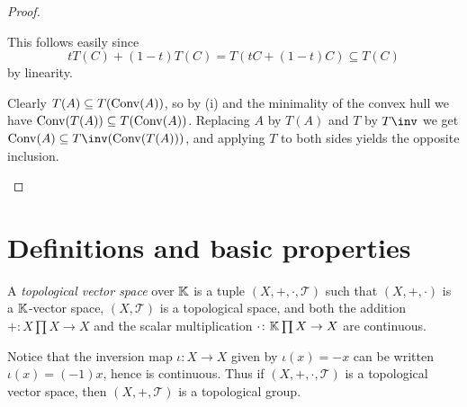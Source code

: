 \documentclass[article, a4paper, 11pt, oneside]{memoir}
\numberwithin{equation}{chapter}
\newcommand{\calT}{\mathcal{T}}
\begin{document}
\begin{proof}
\begin{proofsec}
    \item[Proof of \subcref{enum:image-of-convex-set}]
    This follows easily since
    \begin{equation*}
        t T(C) + (1-t) T(C)
            = T(tC + (1-t)C)
            \subseteq T(C)
    \end{equation*}
    by linearity.

    \item[Proof of \subcref{enum:convex-hull-isomorphism}]
    Clearly $T(A) \subseteq T(\operatorname{Conv}(A))$, so by (i) and the minimality of the convex hull we have $\operatorname{Conv}(T(A)) \subseteq T(\operatorname{Conv}(A))$. Replacing $A$ by $T(A)$ and $T$ by $T\inv$ we get $\conv(A) \subseteq T\inv(\conv(T(A)))$, and applying $T$ to both sides yields the opposite inclusion.
\end{proofsec}
\end{proof}


\section{Definitions and basic properties}

\begin{definition}
    A \emph{topological vector space} over $\mathbb{K}$ is a tuple $(X, +, \cdot, \calT)$ such that $(X, +, \cdot)$ is a $\mathbb{K}$-vector space, $(X, \calT)$ is a topological space, and both the addition $+ \colon X \prod X \to X$ and the scalar multiplication $\cdot \colon \mathbb{K} \prod X \to X$ are continuous.
\end{definition}
%
Notice that the inversion map $\iota \colon X \to X$ given by $\iota(x) = -x$ can be written $\iota(x) = (-1)x$, hence is continuous. Thus if $(X, +, \cdot, \calT)$ is a topological vector space, then $(X, +, \calT)$ is a topological group.
\end{document}
